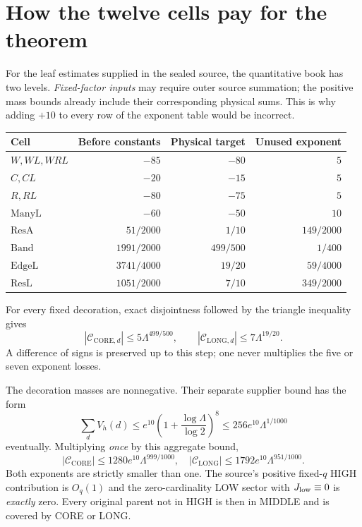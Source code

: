 \documentclass[11pt]{article}
\newcommand{\Lam}{\Lambda}
\newcommand{\csmall}{\mathrm{CORE}}
\newcommand{\clong}{\mathrm{LONG}}
\theoremstyle{definition}
\theoremstyle{remark}
\newcommand{\1}{\mathbf 1}
\begin{document}
\section{How the twelve cells pay for the theorem}\label{sec:accounting}

For the leaf estimates supplied in the sealed source, the
quantitative book has two levels. \emph{Fixed-factor inputs}
may require outer source summation; the positive mass bounds
already include their corresponding physical sums. This is
why adding $+10$ to every row of the exponent table would
be incorrect.

\begin{center}\small
\begin{tabular}{@{}lrrr@{}}
\toprule
Cell & Before constants & Physical target & Unused exponent\\\midrule
$W,WL,WRL$ & $-85$ & $-80$ & $5$\\
$C,CL$ & $-20$ & $-15$ & $5$\\
$R,RL$ & $-80$ & $-75$ & $5$\\
$\mathrm{ManyL}$ & $-60$ & $-50$ & $10$\\
$\mathrm{ResA}$ & $51/2000$ & $1/10$ & $149/2000$\\
$\mathrm{Band}$ & $1991/2000$ & $499/500$ & $1/400$\\
$\mathrm{EdgeL}$ & $3741/4000$ & $19/20$ & $59/4000$\\
$\mathrm{ResL}$ & $1051/2000$ & $7/10$ & $349/2000$\\
\bottomrule
\end{tabular}
\end{center}

For every fixed decoration, exact disjointness followed by
the triangle inequality gives
\begin{equation}\label{eq:per-decoration-conclusion}
 |\mathcal C_{\csmall,d}|\le5\Lam^{499/500},
 \qquad |\mathcal C_{\clong,d}|\le7\Lam^{19/20}.
\end{equation}
A difference of signs is preserved up to this step; one
never multiplies the five or seven exponent losses.

The decoration masses are nonnegative. Their separate
supplier bound has the form
\begin{equation}\label{eq:decor-bound}
 \sum_dV_h(d)\le e^{10}\left(1+\frac{\log\Lam}{\log2}\right)^8
 \le256e^{10}\Lam^{1/1000}
\end{equation}
eventually. Multiplying \emph{once} by this aggregate bound,
\begin{equation}\label{eq:final-cost}
 \boxed{
 |\mathcal C_{\csmall}|\le1280e^{10}\Lam^{999/1000},\quad
 |\mathcal C_{\clong}|\le1792e^{10}\Lam^{951/1000}.}
\end{equation}
Both exponents are strictly smaller than one. The source's
positive fixed-$q$ HIGH contribution is $O_q(1)$ and the
zero-cardinality LOW sector with $J_{\rm low}\equiv0$
is \emph{exactly} zero. Every original parent not in HIGH
is then in MIDDLE and is covered by CORE or LONG.
\end{document}
